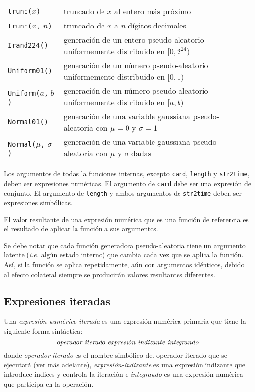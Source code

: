 \documentclass[11pt,spanish]{report}
\begin{document}
\begin{tabular}{@{}p{112pt}p{328pt}@{}}
{\tt trunc(}$x${\tt)}&truncado de $x$ al entero más próximo\\
{\tt trunc(}$x${\tt,} $n${\tt)}&truncado de $x$ a $n$ dígitos decimales\\
{\tt Irand224()}&generación de un entero pseudo-aleatorio uniformemente distribuido en $[0,2^{24})$\\
{\tt Uniform01()}&generación de un número pseudo-aleatorio uniformemente distribuido en $[0,1)$\\
{\tt Uniform(}$a${\tt,} $b${\tt)}&generación de un número pseudo-aleatorio uniformemente distribuido en $[a,b)$\\
{\tt Normal01()}&generación de una variable gaussiana pseudo-aleatoria con $\mu=0$ y $\sigma=1$\\
{\tt Normal(}$\mu${\tt,} $\sigma${\tt)}&generación de una variable gaussiana pseudo-aleatoria con $\mu$ y $\sigma$ dadas\\
\end{tabular}

Los argumentos de todas la funciones internas, excepto {\tt card}, {\tt length} y {\tt str2time}, deben ser expresiones numéricas. El argumento de {\tt card} debe ser una expresión de conjunto. El argumento de {\tt length} y ambos argumentos de {\tt str2time} deben ser expresiones simbólicas.

El valor resultante de una expresión numérica que es una función de referencia es el resultado de aplicar la función a sus argumentos.

Se debe notar que cada función generadora pseudo-aleatoria tiene un argumento latente ({\it i.e.} algún estado interno) que cambia cada vez que se aplica la función. Así, si la función se aplica repetidamente, aún con argumentos idénticos, debido al efecto colateral siempre se producirán valores resultantes diferentes.

\subsection{Expresiones iteradas}
\label{itexpr}

Una {\it expresión numérica iterada} es una expresión numérica primaria que tiene la siguiente forma sintáctica:
$$\mbox{\it operador-iterado expresión-indizante integrando}$$
donde {\it operador-iterado} es el nombre simbólico del operador iterado que se ejecutará (ver más adelante), {\it expresión-indizante} es una expresión indizante que introduce índices y controla la iteración e {\it integrando} es una expresión numérica que participa en la operación.
\end{document}
